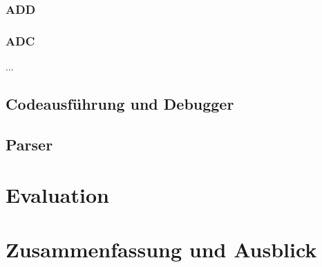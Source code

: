 \documentclass[a4paper, 11pt, onecolumn]{article}
\begin{document}
\subsubsection*{ADD}

\subsubsection*{ADC}

...

\subsection{Codeausführung und Debugger}


\subsection{Parser}


\section{Evaluation}

\section{Zusammenfassung und Ausblick}



\end{document}
